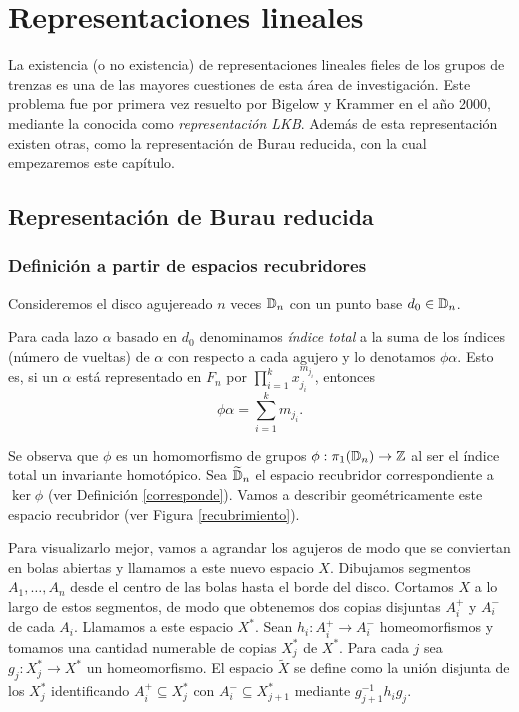 \documentclass[TFG.tex]{subfiles}
\begin{document}
\chapter{Representaciones lineales}\label{capitulo4}

La existencia (o no existencia) de representaciones lineales fieles de los grupos de trenzas es una de las mayores cuestiones de esta área de investigación. Este problema fue por primera vez resuelto por Bigelow \cite{Bigelow} y Krammer \cite{Krammer} en el año 2000, mediante la conocida como \emph{representación LKB}. Además de esta representación existen otras, como la representación de Burau reducida, con la cual empezaremos este capítulo.

\section{Representación de Burau reducida}

%

\subsection{Definición a partir de espacios recubridores}

Consideremos el disco agujereado $n$ veces $\mathbb{D}_n$ con un punto base $d_0\in\mathbb{D}_n$. 
\begin{defi}
Para cada lazo $\alpha$ basado en $d_0$ denominamos \emph{índice total}  a la suma de los índices (número de vueltas) de $\alpha$ con respecto a cada agujero y lo denotamos $\phi\alpha$. Esto es, si un $\alpha$ está representado en $F_n$ por $\prod_{i=1}^k x_{j_i}^{m_{j_i}}$, entonces 
\[
\phi\alpha=\sum_{i=1}^{k}m_{j_i}.
\]
\end{defi}

Se observa que $\phi$ es un homomorfismo de grupos $\phi:\pi_1(\mathbb{D}_n)\to\mathbb{Z}$ al ser el índice total un invariante homotópico. Sea $\widetilde{\mathbb{D}}_n$ el espacio recubridor correspondiente a $\ker\phi$ (ver Definición \ref{corresponde}). Vamos a describir geométricamente este espacio recubridor (ver Figura \ref{recubrimiento}). 


Para visualizarlo mejor, vamos a agrandar los agujeros de modo que se conviertan en bolas abiertas y llamamos a este nuevo espacio $X$. Dibujamos segmentos $A_1,\dots, A_n$ desde el centro de las bolas hasta el borde del disco. Cortamos $X$ a lo largo de estos segmentos, de modo que obtenemos dos copias disjuntas $A_i^+$ y $A_i^-$ de cada $A_i$. Llamamos a este espacio $X^*$. Sean $h_i:A_i^+\to A_i^-$ homeomorfismos y tomamos una cantidad numerable de copias $X^*_j$ de $X^*$. Para cada $j$ sea $g_j:X^*_j\to X^*$ un homeomorfismo. El espacio $\widetilde{X}$ se define como la unión disjunta de los $X^*_j$ identificando $A_i^+\subseteq X^*_j$ con $A_i^-\subseteq X^*_{j+1}$ mediante $g_{j+1}^{-1}h_ig_j$.
\end{document}
